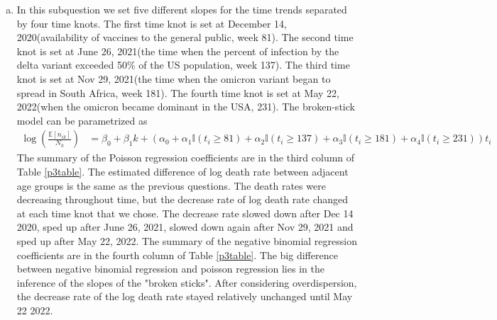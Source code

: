 \documentclass[12pt]{article}
\begin{document}
\begin{enumerate}[(a)]
	\item In this subquestion we set five different slopes for the time trends separated by four time knots. The first time knot is set at December 14, 2020(availability of vaccines to the general public, week 81). The second time knot is set at June 26, 2021(the time when the percent of infection by the delta variant exceeded 50\% of the US population, week 137). The third time knot is set at Nov 29, 2021(the time when the omicron variant began to spread in South Africa, week 181). The fourth time knot is set at May 22, 2022(when the omicron became dominant in the USA, 231). The broken-stick model can be parametrized as
	 \begin{align*}
		\log(\frac{\mathbb{E}[n_{ik}]}{N_{k}}) &= \beta_{0} + \beta_{1}k + \left(\alpha_{0} + \alpha_{1}\mathbb{I}(t_{i} \geq 81) + \alpha_{2}\mathbb{I}(t_{i} \geq 137) +\alpha_{3} \mathbb{I}(t_{i} \geq 181) + \alpha_{4}\mathbb{I}(t_{i} \geq 231)\right) t_{i}
	\end{align*}
	The summary of the Poisson regression coefficients are in the third column of Table \ref{p3table}. The estimated difference of log death rate between adjacent age groups is the same as the previous questions. The death rates were decreasing throughout time, but the decrease rate of log death rate changed at each time knot that we chose. The decrease rate slowed down after Dec 14 2020, sped up after June 26, 2021, slowed down again after Nov 29, 2021 and sped up after May 22, 2022. The summary of the negative binomial regression coefficients are in the fourth column of Table \ref{p3table}. The big difference between negative binomial regression and poisson regression lies in the inference of the slopes of the "broken sticks". After considering overdispersion, the decrease rate of the log death rate stayed relatively unchanged until May 22 2022.
	

\end{enumerate}
\end{document}
